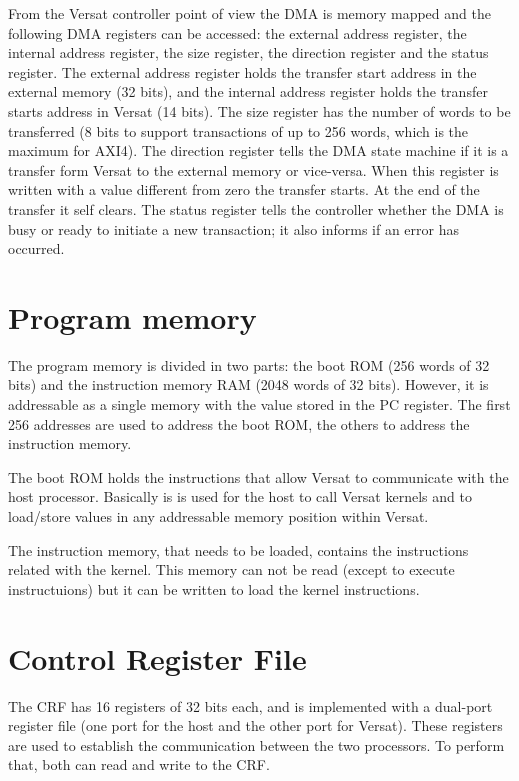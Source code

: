 From the Versat controller point of view the DMA is memory mapped and
the following DMA registers can be accessed: the external address
register, the internal address register, the size register, the
direction register and the status register. The external address
register holds the transfer start address in the external memory (32
bits), and the internal address register holds the transfer starts
address in Versat (14 bits). The size register has the number of words
to be transferred (8 bits to support transactions of up to 256 words,
which is the maximum for AXI4). The direction register tells the DMA
state machine if it is a transfer form Versat to the external memory
or vice-versa. When this register is written with a value different
from zero the transfer starts. At the end of the transfer it self
clears. The status register tells the controller whether the DMA is
busy or ready to initiate a new transaction; it also informs if an
error has occurred.

\section{Program memory}
\label{section:programMemory}

The program memory is divided in two parts: the boot ROM (256 words of
32 bits) and the instruction memory RAM (2048 words of 32
bits). However, it is addressable as a single memory with the value
stored in the PC register. The first 256 addresses are used to address
the boot ROM, the others to address the instruction memory.

The boot ROM holds the instructions that allow Versat to communicate
with the host processor. Basically is is used for the host to call
Versat kernels and to load/store values in any addressable memory
position within Versat.

The instruction memory, that needs to be loaded, contains the
instructions related with the kernel. This memory can not be read
(except to execute instructuions) but it can be written to load the
kernel instructions.

\section{Control Register File}
\label{section:controlRegisterFile}

The CRF has 16 registers of 32 bits each, and is implemented with a
dual-port register file (one port for the host and the other port for
Versat). These registers are used to establish the communication
between the two processors. To perform that, both can read and write
to the CRF.


